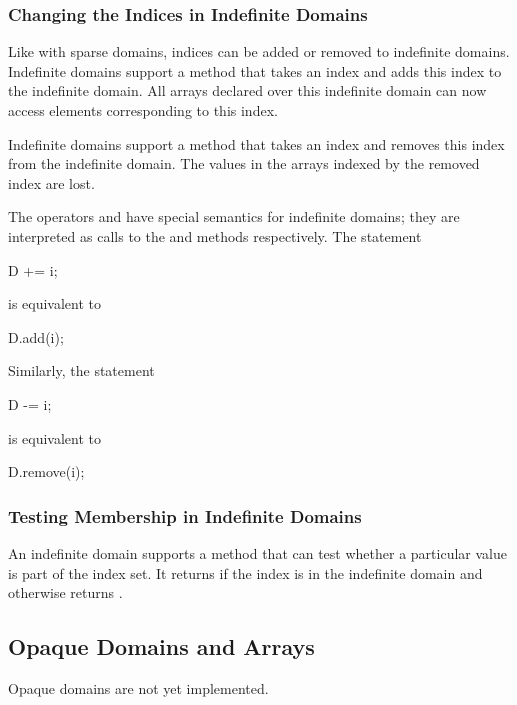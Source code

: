 \subsubsection{Changing the Indices in Indefinite Domains}

Like with sparse domains, indices can be added or removed to
indefinite domains.  Indefinite domains support a method 
that takes an index and adds this index to the indefinite domain.  All
arrays declared over this indefinite domain can now access elements
corresponding to this index.

Indefinite domains support a method  that takes an index
and removes this index from the indefinite domain.  The values in the
arrays indexed by the removed index are lost.

The operators \chpl{+=} and \chpl{-=} have special semantics for
indefinite domains; they are interpreted as calls to the 
and  methods respectively.  The statement
\begin{chapel}
D += i;
\end{chapel}
is equivalent to
\begin{chapel}
D.add(i);
\end{chapel}
Similarly, the statement
\begin{chapel}
D -= i;
\end{chapel}
is equivalent to
\begin{chapel}
D.remove(i);
\end{chapel}

\subsubsection{Testing Membership in Indefinite Domains}

An indefinite domain supports a  method that can test
whether a particular value is part of the index set. It
returns  if the index is in the indefinite domain and
otherwise returns .

\subsection{Opaque Domains and Arrays}
\label{Opaque_Domains_and_Arrays}

\begin{status}
Opaque domains are not yet implemented.
\end{status}

